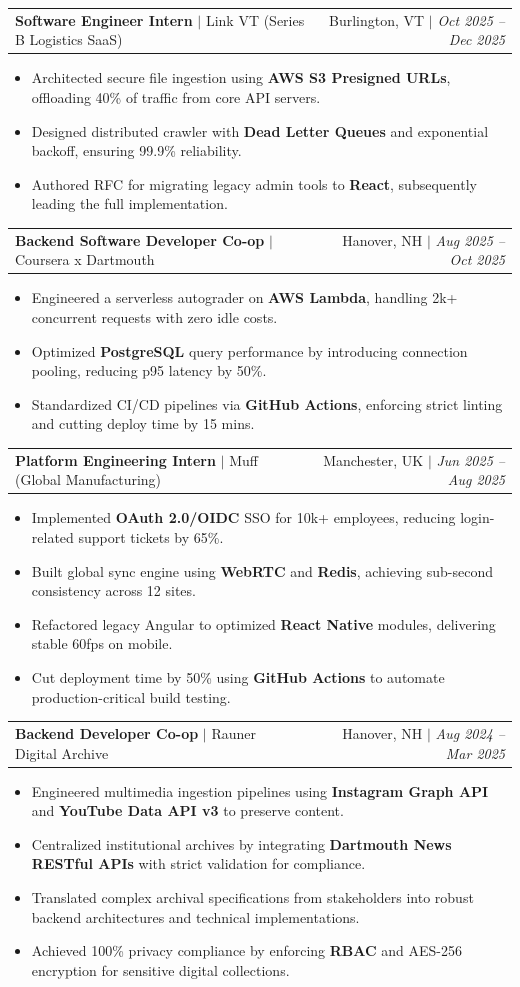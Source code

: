 \documentclass[letterpaper,10pt]{article}
\makeatletter
\newcommand{\resumeItem}[1]{
  \item\small{#1\vspace{-1pt}}
}
\newcommand{\resumeSubheading}[4]{
  \vspace{-1pt}\item
    \begin{tabular*}{0.97\textwidth}[t]{l@{\extracolsep{\fill}}r}
      \textbf{#3} $|$ #1 & #2 $|$ \textit{\small #4} \\
    \end{tabular*}\vspace{-5pt}
}
\newcommand{\resumeItemListStart}{\begin{itemize}[leftmargin=0.15in]}
\newcommand{\resumeItemListEnd}{\end{itemize}\vspace{-2pt}}
\makeatother
\begin{document}
    \resumeSubheading
      {Link VT (Series B Logistics SaaS)}{Burlington, VT}
      {Software Engineer Intern}{Oct 2025 -- Dec 2025}
      \resumeItemListStart
        \resumeItem{Architected secure file ingestion using \textbf{AWS S3 Presigned URLs}, offloading 40\% of traffic from core API servers.}
        \resumeItem{Designed distributed crawler with \textbf{Dead Letter Queues} and exponential backoff, ensuring 99.9\% reliability.}
        \resumeItem{Authored RFC for migrating legacy admin tools to \textbf{React}, subsequently leading the full implementation.}
      \resumeItemListEnd

    \resumeSubheading
      {Coursera x Dartmouth}{Hanover, NH}
      {Backend Software Developer Co-op}{Aug 2025 -- Oct 2025}
      \resumeItemListStart
        \resumeItem{Engineered a serverless autograder on \textbf{AWS Lambda}, handling 2k+ concurrent requests with zero idle costs.}
        \resumeItem{Optimized \textbf{PostgreSQL} query performance by introducing connection pooling, reducing p95 latency by 50\%.}
        \resumeItem{Standardized CI/CD pipelines via \textbf{GitHub Actions}, enforcing strict linting and cutting deploy time by 15 mins.}
      \resumeItemListEnd

    \resumeSubheading
      {Muff (Global Manufacturing)}{Manchester, UK}
      {Platform Engineering Intern}{Jun 2025 -- Aug 2025}
      \resumeItemListStart
        \resumeItem{Implemented \textbf{OAuth 2.0/OIDC} SSO for 10k+ employees, reducing login-related support tickets by 65\%.}
        \resumeItem{Built global sync engine using \textbf{WebRTC} and \textbf{Redis}, achieving sub-second consistency across 12 sites.}
        \resumeItem{Refactored legacy Angular to optimized \textbf{React Native} modules, delivering stable 60fps on mobile.}
        \resumeItem{Cut deployment time by 50\% using \textbf{GitHub Actions} to automate production-critical build testing.}
      \resumeItemListEnd

    \resumeSubheading
      {Rauner Digital Archive}{Hanover, NH}
      {Backend Developer Co-op}{Aug 2024 -- Mar 2025}
      \resumeItemListStart
        \resumeItem{Engineered multimedia ingestion pipelines using \textbf{Instagram Graph API} and \textbf{YouTube Data API v3} to preserve content.}
        \resumeItem{Centralized institutional archives by integrating \textbf{Dartmouth News RESTful APIs} with strict validation for compliance.}
        \resumeItem{Translated complex archival specifications from stakeholders into robust backend architectures and technical implementations.}
        \resumeItem{Achieved 100\% privacy compliance by enforcing \textbf{RBAC} and AES-256 encryption for sensitive digital collections.}
      \resumeItemListEnd
\end{document}
